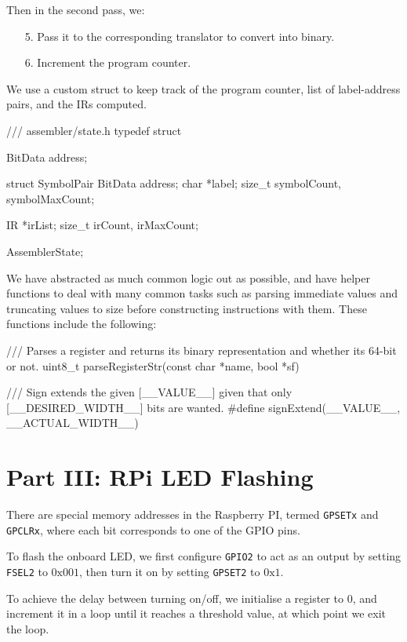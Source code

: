 \documentclass{ictex}
\begin{document}
Then in the second pass, we:

\begin{enumerate}
    \item[5.] Pass it to the corresponding translator to convert into binary.
    \item[6.] Increment the program counter.
\end{enumerate}

We use a custom struct to keep track of the program counter, list of label-address pairs, and the IRs computed.

\begin{code}
/// assembler/state.h
typedef struct {
    BitData address;

    struct SymbolPair {
        BitData address;
        char *label;
    }
    size_t symbolCount, symbolMaxCount;

    IR *irList;
    size_t irCount, irMaxCount;
} AssemblerState;
\end{code}

We have abstracted as much common logic out as possible, and have helper functions to deal with many common tasks such as parsing immediate values and truncating values to size before constructing instructions with them. These functions include the following:

\begin{code}
    /// Parses a register and returns its binary representation and whether its 64-bit or not.
    uint8_t parseRegisterStr(const char *name, bool *sf)

    /// Sign extends the given [__VALUE__] given that only [__DESIRED_WIDTH__] bits are wanted.
    #define signExtend(__VALUE__, __ACTUAL_WIDTH__)
\end{code}

\section{Part III: RPi LED Flashing}

There are special memory addresses in the Raspberry PI, termed \texttt{GPSETx} and \texttt{GPCLRx}, where each bit corresponds to one of the GPIO pins.

To flash the onboard LED, we first configure \texttt{GPIO2} to act as an output by setting \texttt{FSEL2} to $0\text{x}001$, then turn it on by setting \texttt{GPSET2} to $0\text{x}1$.

To achieve the delay between turning on/off, we initialise a register to $0$, and increment it in a loop until it reaches a threshold value, at which point we exit the loop.
\end{document}
